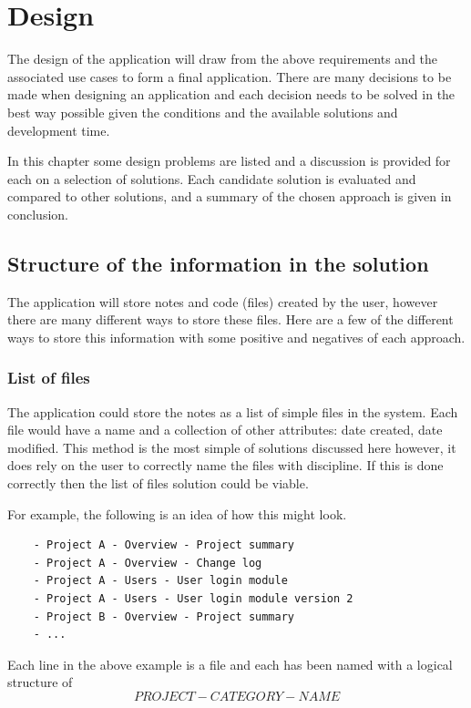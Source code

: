 \chapter{Design}\label{design}

The design of the application will draw from the above requirements and
the associated use cases to form a final application. There are many
decisions to be made when designing an application and each decision needs to
be solved in the best way possible given the conditions and the available
solutions and development time.

In this chapter some design problems are listed and a discussion is provided
for each on a selection of solutions. Each candidate solution is evaluated and
compared to other solutions, and a summary of the chosen approach is given in
conclusion.

\section{Structure of the information in the solution}\label{structure-of-the-information-in-the-solution}

The application will store notes and code (files) created by the user, however
there are many different ways to store these files. Here are a few of the
different ways to store this information with some positive and negatives of each approach.

\subsection{List of files}\label{list-of-files}

The application could store the notes as a list of simple files in the system.
Each file would have a name and a collection of other attributes: date created,
date modified. This method is the most simple of solutions discussed here however, it does rely on the user to correctly name the files with discipline. If this is done correctly then the list of files solution could be viable.

For example, the following is an idea of how this might look.

\begin{verbatim}
    - Project A - Overview - Project summary
    - Project A - Overview - Change log
    - Project A - Users - User login module
    - Project A - Users - User login module version 2
    - Project B - Overview - Project summary
    - ...
\end{verbatim}
Each line in the above example is a file and each has been named with a logical structure of $$ PROJECT - CATEGORY - NAME $$

